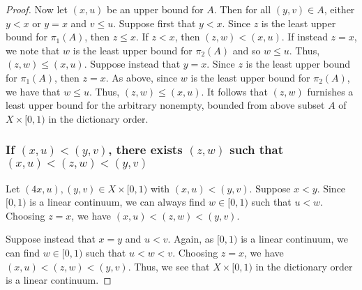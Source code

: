\begin{solution}
\begin{proof}
    Now let $(x, u)$ be an upper bound for $A$.
    Then for all $(y, v) \in A$, either $y < x$ or $y = x$ and $v \leq u$.
    Suppose first that $y < x$.
    Since $z$ is the least upper bound for $\pi_1(A)$, then $z \leq x$.
    If $z < x$, then $(z, w) < (x, u)$.
    If instead $z = x$, we note that $w$ is the least upper bound for $\pi_2(A)$ and so $w \leq u$.
    Thus, $(z, w) \leq (x, u)$.
    Suppose instead that $y = x$. Since $z$ is the least upper bound for $\pi_1(A)$, then $z = x$.
    As above, since $w$ is the least upper bound for $\pi_2(A)$, we have that $w \leq u$.
    Thus, $(z, w) \leq (x, u)$.
    It follows that $(z, w)$ furnishes a least upper bound for the arbitrary nonempty, bounded from above subset $A$ of $X \times [0, 1)$ in the dictionary order.

    \subsubsection*{If $(x, u) < (y, v)$, there exists $(z, w)$ such that $(x, u) < (z, w) < (y, v)$}
    Let $(4x, u), (y, v) \in X \times [0, 1)$ with $(x, u) < (y, v)$.
    Suppose $x < y$.
    Since $[0, 1)$ is a linear continuum, we can always find $w \in [0, 1)$ such that $u < w$.
    Choosing $z = x$, we have $(x, u) < (z, w) < (y, v)$.

    Suppose instead that $x = y$ and $u < v$.
    Again, as $[0, 1)$ is a linear continuum, we can find $w \in [0, 1)$ such that $u < w < v$.
    Choosing $z = x$, we have $(x, u) < (z, w) < (y, v)$.
    Thus, we see that $X \times [0, 1)$ in the dictionary order is a linear continuum.
  \end{proof}
\end{solution}
\newpage

